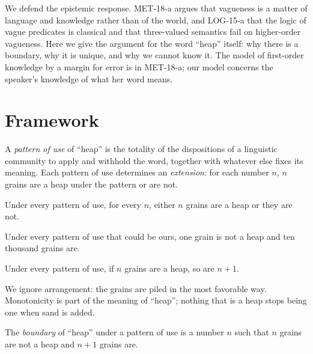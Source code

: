 \documentclass{situationist-preprint}
\begin{document}
We defend the epistemic response. MET-18-a argues that vagueness is a matter of language and knowledge rather than of the world, and LOG-15-a that the logic of vague predicates is classical and that three-valued semantics fail on higher-order vagueness. Here we give the argument for the word \enquote{heap} itself: why there is a boundary, why it is unique, and why we cannot know it. The model of first-order knowledge by a margin for error is in MET-18-a; our model concerns the speaker's knowledge of what her word means.

\section{Framework}\label{s:frame}

\begin{definition}\label{d:use}
A \emph{pattern of use} of \enquote{heap} is the totality of the dispositions of a linguistic community to apply and withhold the word, together with whatever else fixes its meaning. Each pattern of use determines an \emph{extension}: for each number $n$, $n$ grains are a heap under the pattern or are not.
\end{definition}

\begin{assumption}[Bivalence]\label{a:biv}
Under every pattern of use, for every $n$, either $n$ grains are a heap or they are not.
\end{assumption}

\begin{assumption}\label{a:clear}
Under every pattern of use that could be ours, one grain is not a heap and ten thousand grains are.
\end{assumption}

\begin{assumption}[Monotonicity]\label{a:mono}
Under every pattern of use, if $n$ grains are a heap, so are $n+1$.
\end{assumption}

We ignore arrangement: the grains are piled in the most favorable way. Monotonicity is part of the meaning of \enquote{heap}; nothing that is a heap stops being one when sand is added.

\begin{definition}\label{d:bound}
The \emph{boundary} of \enquote{heap} under a pattern of use is a number $n$ such that $n$ grains are not a heap and $n+1$ grains are.
\end{definition}
\end{document}
